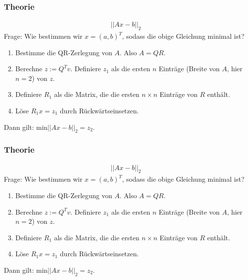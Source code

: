\documentclass{beamer}
\begin{document}
\begin{frame}
    \frametitle{Theorie}
    \begin{align*}
        ||Ax - b||_2
    \end{align*}
    {\color{white}Frage: Wie bestimmen wir \(x = (a, b)^T\), sodass die obige Gleichung minimal ist?}
    \begin{enumerate}
        \item {\color{white}Bestimme die QR-Zerlegung von \(A\). Also \(A = QR\).}
        \item {\color{white}Berechne \(z := Q^T v\). Definiere \(z_1\) als die ersten \(n\) Einträge (Breite von \(A\), hier \(n = 2\)) von \(z\).}
        \item {\color{white}Definiere \(R_1\) als die Matrix, die die ersten \(n \times n\) Einträge von \(R\) enthält.}
        \item {\color{white}Löse \(R_1 x = z_1\) durch Rückwärtseinsetzen.}
    \end{enumerate}
    {\color{white}Dann gilt: \(\text{min}||Ax - b||_2 = z_2\).}
\end{frame}

\begin{frame}
    \frametitle{Theorie}
    \begin{align*}
        ||Ax - b||_2
    \end{align*}
    Frage: Wie bestimmen wir \(x = (a, b)^T\), sodass die obige Gleichung minimal ist?
    \begin{enumerate}
        \item {\color{white}Bestimme die QR-Zerlegung von \(A\). Also \(A = QR\).}
        \item {\color{white}Berechne \(z := Q^T v\). Definiere \(z_1\) als die ersten \(n\) Einträge (Breite von \(A\), hier \(n = 2\)) von \(z\).}
        \item {\color{white}Definiere \(R_1\) als die Matrix, die die ersten \(n \times n\) Einträge von \(R\) enthält.}
        \item {\color{white}Löse \(R_1 x = z_1\) durch Rückwärtseinsetzen.}
    \end{enumerate}
    {\color{white}Dann gilt: \(\text{min}||Ax - b||_2 = z_2\).}
\end{frame}
\end{document}
